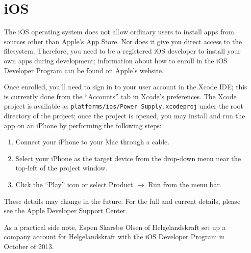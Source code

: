 \section{iOS}

The iOS operating system does not allow ordinary users to install apps from
sources other than Apple's App Store. Nor does it give you direct access to the
filesystem. Therefore, you need to be a registered iOS developer to install
your own apps during development; information about how to enroll in the iOS
Developer Program can be found on Apple's website\cite{iOSDevProgram}.

Once enrolled, you'll need to sign in to your user account in the Xcode IDE;
this is currently done from the ``Accounts'' tab in Xcode's preferences.
The Xcode project is available as \mbox{\texttt{platforms/ios/Power 
Supply.xcodeproj}} under the root directory of the project; once the project
is opened, you may install and run the app on an iPhone by performing the
following steps:

\begin{enumerate}
  \item Connect your iPhone to your Mac through a cable.
  \item Select your iPhone as the target device from the drop-down menu near
        the top-left of the project window.
  \item Click the ``Play'' icon or select Product $\rightarrow$ Run from the
        menu bar.
\end{enumerate}

These details may change in the future. For the full and current details,
please see the Apple Developer Support Center\cite{appleSupport}.

As a practical side note, Espen Skarsbø Olsen of Helgelandskraft set up a
company account for Helgelandskraft with the iOS Developer Program in October
of 2013.
